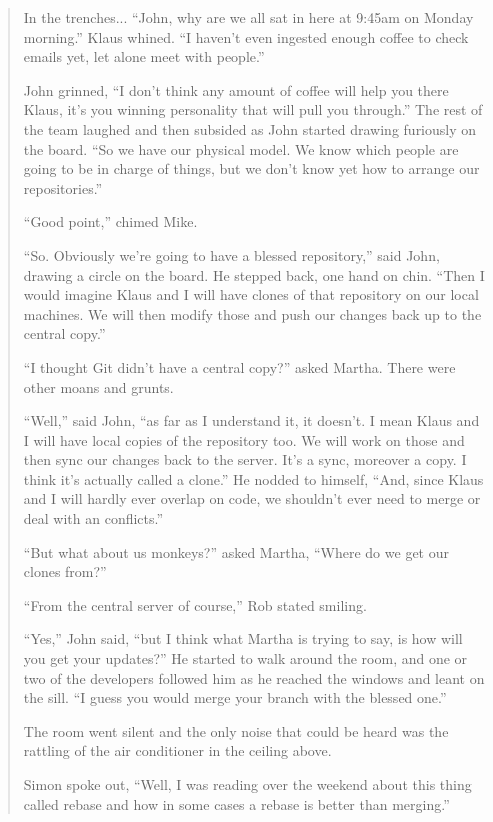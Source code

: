 \begin{quote}In the trenches...
``John, why are we all sat in here at 9:45am on Monday morning.''  Klaus whined.  ``I haven't even ingested enough coffee to check emails yet, let alone meet with people.''

John grinned, ``I don't think any amount of coffee will help you there Klaus, it's you winning personality that will pull you through.''  The rest of the team laughed and then subsided as John started drawing furiously on the board.  ``So we have our physical model.  We know which people are going to be in charge of things, but we don't know yet how to arrange our repositories.''

``Good point,'' chimed Mike. 

``So.  Obviously we're going to have a blessed repository,'' said John, drawing a circle on the board.  He stepped back, one hand on chin.  ``Then I would imagine Klaus and I will have clones of that repository on our local machines.  We will then modify those and push our changes back up to the central copy.''

``I thought Git didn't have a central copy?'' asked Martha.  There were other moans and grunts. 

``Well,'' said John, ``as far as I understand it, it doesn't.  I mean Klaus and I will have local copies of the repository too.  We will work on those and then sync our changes back to the server.  It's a sync, moreover a copy.  I think it's actually called a clone.''  He nodded to himself, ``And, since Klaus and I will hardly ever overlap on code, we shouldn't ever need to merge or deal with an conflicts.''

``But what about us monkeys?'' asked Martha, ``Where do we get our clones from?''

``From the central server of course,'' Rob stated smiling. 

``Yes,'' John said, ``but I think what Martha is trying to say, is how will you get your updates?''  He started to walk around the room, and one or two of the developers followed him as he reached the windows and leant on the sill.  ``I guess you would merge your branch with the blessed one.''

The room went silent and the only noise that could be heard was the rattling of the air conditioner in the ceiling above. 

Simon spoke out, ``Well, I was reading over the weekend about this thing called rebase and how in some cases a rebase is better than merging.''


\end{quote}
